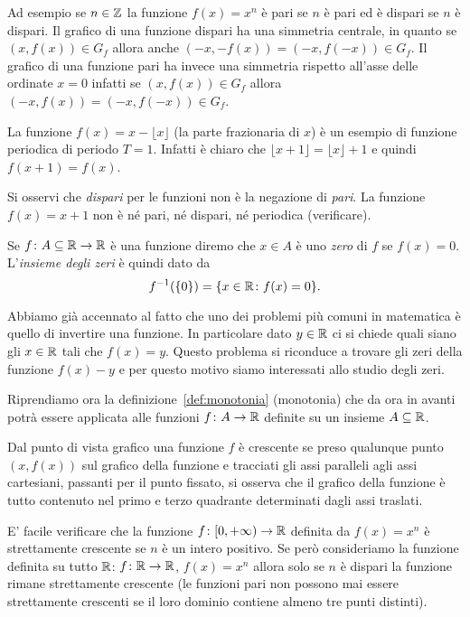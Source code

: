 Ad esempio se $n\in {\mathbb Z}$ la funzione $f(x)=x^n$
è pari se $n$ è pari ed è dispari se $n$ è dispari.
Il grafico di una funzione dispari ha una simmetria
centrale, in quanto se $(x,f(x))\in G_f$ allora
anche $(-x,-f(x)) = (-x,f(-x))\in G_f$.
Il grafico di una funzione pari ha invece una
simmetria rispetto all'asse delle ordinate $x=0$
infatti se $(x,f(x))\in G_f$ allora $(-x,f(x)) = (-x,f(-x)) \in G_f$.

La funzione $f(x) = x - \lfloor x\rfloor$ (la parte frazionaria di $x$)
è un esempio di funzione periodica di periodo $T=1$. Infatti
è chiaro che $\lfloor x+1\rfloor = \lfloor x \rfloor +1$ e quindi
$f(x+1)=f(x)$.

Si osservi che \emph{dispari} per le funzioni non è la negazione
di \emph{pari}.
La funzione $f(x) = x+1$ non è né pari, né dispari, né periodica
(verificare).

\begin{definition}[zeri]
  Se $f\colon A\subseteq {\mathbb R} \to {\mathbb R}$ è una funzione diremo che
  $x\in A$ è uno \emph{zero} di $f$ se $f(x)=0$.
  L'\emph{insieme degli zeri}%
%
  è quindi dato da
  \[
    f^{-1}({\left\{ 0 \right\}}) = {\left\{ x\in {\mathbb R}\colon f(x) = 0 \right\}}.
  \]
\end{definition}

Abbiamo già accennato al fatto che uno dei problemi più comuni in
matematica è quello di invertire una funzione. In particolare 
dato $y\in {\mathbb R}$ ci si chiede quali siano gli $x\in {\mathbb R}$ 
tali che $f(x)=y$. 
Questo problema si riconduce
a trovare gli zeri della funzione $f(x)-y$ e per questo motivo 
siamo interessati allo studio degli zeri.

Riprendiamo ora la definizione~\ref{def:monotonia} (monotonia) che da ora in avanti 
potrà essere applicata alle funzioni $f\colon A \to {\mathbb R}$ definite 
su un insieme $A\subseteq {\mathbb R}$.

Dal punto di vista grafico una funzione $f$ è crescente
se preso qualunque punto $(x,f(x))$ sul grafico della funzione
e tracciati gli assi paralleli agli assi cartesiani, passanti
per il punto fissato, si osserva che il grafico della funzione
è tutto contenuto nel primo e terzo quadrante determinati
dagli assi traslati.

E' facile verificare che la funzione $f\colon [0,+\infty)\to {\mathbb R}$
definita da $f(x)=x^n$
è strettamente crescente se $n$ è un intero positivo.
Se però consideriamo la funzione definita su tutto
${\mathbb R}$: $f\colon {\mathbb R} \to {\mathbb R}$,
$f(x)=x^n$ allora solo se $n$ è dispari la funzione rimane
strettamente crescente
(le funzioni pari non possono mai essere strettamente crescenti se
il loro dominio contiene almeno tre punti distinti).

